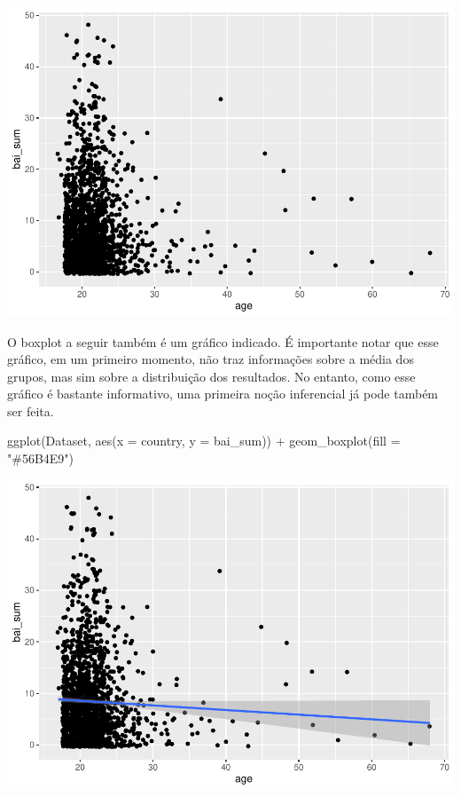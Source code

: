 \documentclass[
]{book}
\newenvironment{Shaded}{\begin{snugshade}}{\end{snugshade}}
\newcommand{\AttributeTok}[1]{\textcolor[rgb]{0.77,0.63,0.00}{#1}}
\newcommand{\FunctionTok}[1]{\textcolor[rgb]{0.00,0.00,0.00}{#1}}
\newcommand{\NormalTok}[1]{#1}
\newcommand{\SpecialCharTok}[1]{\textcolor[rgb]{0.00,0.00,0.00}{#1}}
\newcommand{\StringTok}[1]{\textcolor[rgb]{0.31,0.60,0.02}{#1}}
\begin{document}
\begin{center}\includegraphics{gitbook-demo_files/figure-latex/unnamed-chunk-23-1} \end{center}

O boxplot a seguir também é um gráfico indicado. É importante notar que esse gráfico, em um primeiro momento, não traz informações sobre a média dos grupos, mas sim sobre a distribuição dos resultados. No entanto, como esse gráfico é bastante informativo, uma primeira noção inferencial já pode também ser feita.

\begin{Shaded}
\begin{Highlighting}[]
\FunctionTok{ggplot}\NormalTok{(Dataset, }\FunctionTok{aes}\NormalTok{(}\AttributeTok{x =}\NormalTok{ country, }\AttributeTok{y =}\NormalTok{ bai\_sum)) }\SpecialCharTok{+}
  \FunctionTok{geom\_boxplot}\NormalTok{(}\AttributeTok{fill =} \StringTok{"\#56B4E9"}\NormalTok{)}
\end{Highlighting}
\end{Shaded}

\begin{center}\includegraphics{gitbook-demo_files/figure-latex/unnamed-chunk-24-1} \end{center}
\end{document}
